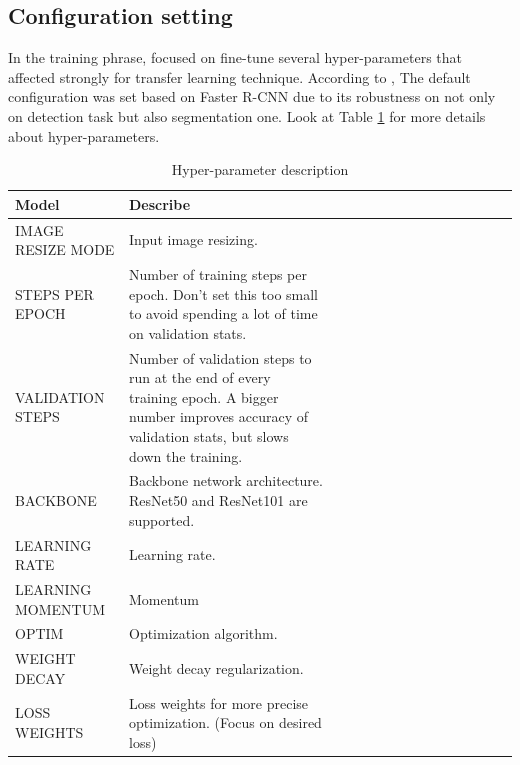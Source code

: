 \subsection{Configuration setting}
\noindent

	In the training phrase, focused on fine-tune several hyper-parameters that affected strongly for transfer learning technique. According to \cite{maskrcnn}, The default configuration was set based on Faster R-CNN due to its robustness on not only on detection task but also segmentation one. Look at Table \ref{table:hyperparameters} for more details about hyper-parameters.
	
	\begin{table}[H]
		\begin{tabularx}{1\textwidth} {
				| >{\raggedright\arraybackslash}X 
				| >{\raggedright\arraybackslash}X
				| >{\raggedright\arraybackslash}X 
				| >{\raggedright\arraybackslash}X
				| >{\raggedright\arraybackslash}X
				| >{\raggedright\arraybackslash}X
				| >{\raggedright\arraybackslash}X
				| >{\raggedright\arraybackslash}X
				| >{\raggedright\arraybackslash}X
				| >{\raggedright\arraybackslash}X
				| >{\raggedright\arraybackslash}X
				| >{\raggedright\arraybackslash}X
				| >{\raggedright\arraybackslash}X
				| >{\raggedright\arraybackslash}X  
				| >{\raggedright\arraybackslash}X | }
			\hline
			Model & Describe \\
			\hline
			IMAGE RESIZE MODE & Input image resizing. \\
			\hline
			STEPS PER EPOCH & Number of training steps per epoch. Don't set this too small to avoid spending a lot of time on validation stats. \\
			\hline
			VALIDATION STEPS & Number of validation steps to run at the end of every training epoch. A bigger number improves accuracy of validation stats, but slows down the training. \\
			\hline
			BACKBONE & Backbone network architecture. ResNet50 and ResNet101 are supported. \\
			\hline
			LEARNING RATE & Learning rate. \\
			\hline
			LEARNING MOMENTUM & Momentum \\
			\hline
			OPTIM & Optimization algorithm. \\
			\hline
			WEIGHT DECAY & Weight decay regularization. \\
			\hline
			LOSS WEIGHTS & Loss weights for more precise optimization. (Focus on desired loss) \\
			\hline
			
		\end{tabularx}
		\caption{Hyper-parameter description}
		\label{table:hyperparameters}
		
	\end{table}
	
